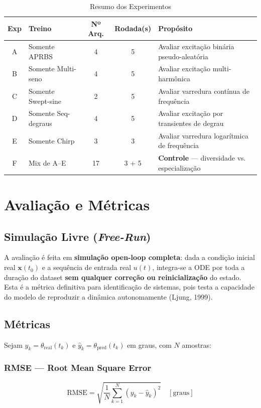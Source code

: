 \documentclass[11pt,a4paper]{article}
\begin{document}
\begin{table}[hbt!]
\centering
\caption{Resumo dos Experimentos}
\vspace{0.2cm}
\begin{tabular}{clccl}
\toprule
\textbf{Exp} & \textbf{Treino} & \textbf{Nº Arq.} & \textbf{Rodada(s)} & \textbf{Propósito} \\
\midrule
A & Somente APRBS & 4 & 5 & Avaliar excitação binária pseudo-aleatória \\
B & Somente Multi-seno & 4 & 5 & Avaliar excitação multi-harmônica \\
C & Somente Swept-sine & 2 & 5 & Avaliar varredura contínua de frequência \\
D & Somente Seq-degraus & 4 & 5 & Avaliar excitação por transientes de degrau \\
E & Somente Chirp & 3 & 3 & Avaliar varredura logarítmica de frequência \\
F & Mix de A--E & 17 & 3 + 5 & \textbf{Controle} — diversidade vs. especialização \\
\bottomrule
\end{tabular}
\end{table}

\section{Avaliação e Métricas}

\subsection{Simulação Livre (\textit{Free-Run})}

A avaliação é feita em \textbf{simulação open-loop completa}: dada a condição inicial real $\mathbf{x}(t_0)$ e a sequência de entrada real $u(t)$, integra-se a ODE por toda a duração do dataset \textbf{sem qualquer correção ou reinicialização} do estado. Esta é a métrica definitiva para identificação de sistemas, pois testa a capacidade do modelo de reproduzir a dinâmica autonomamente (Ljung, 1999).

\subsection{Métricas}

Sejam $y_k = \theta_{\text{real}}(t_k)$ e $\hat{y}_k = \theta_{\text{pred}}(t_k)$ em graus, com $N$ amostras:

\subsubsection*{RMSE — Root Mean Square Error}
\begin{equation}
\text{RMSE} = \sqrt{\frac{1}{N} \sum_{k=1}^{N} (y_k - \hat{y}_k)^2} \quad [\text{graus}]
\end{equation}
\end{document}
